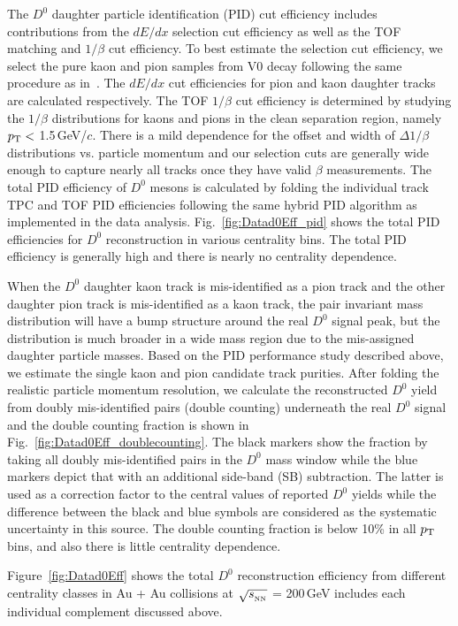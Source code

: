 \documentclass[%
 reprint,	
 amsmath,amssymb,
 aps,
 prc,
]{revtex4-1}
\begin{document}
The $D^0$ daughter particle identification (PID) cut efficiency includes contributions from the $dE/dx$ selection cut efficiency as well as the TOF matching and $1/\beta$ cut efficiency. To best estimate the selection cut efficiency, we select the pure kaon and pion samples from V0 decay following the same procedure as in~\cite{Shao:2005iu,Xu:2008th}. The $dE/dx$ cut efficiencies for pion and kaon daughter tracks are calculated respectively. The TOF $1/\beta$ cut efficiency is determined by studying the $1/\beta$ distributions for kaons and pions in the clean separation region, namely $p_{\rm T}<$ 1.5\,GeV/$c$. There is a mild dependence for the offset and width of $\Delta 1/\beta$ distributions vs. particle momentum and our selection cuts are generally wide enough to capture nearly all tracks once they have valid $\beta$ measurements. The total PID efficiency of $D^0$ mesons is calculated by folding the individual track TPC and TOF PID efficiencies following the same hybrid PID algorithm as implemented in the data analysis. Fig.~\ref{fig:Datad0Eff_pid} shows the total PID efficiencies for $D^0$ reconstruction in various centrality bins. The total PID efficiency is generally high and there is nearly no centrality dependence.

When the $D^0$ daughter kaon track is mis-identified as a pion track and the other daughter pion track is mis-identified as a kaon track, the pair invariant mass distribution will have a bump structure around the real $D^0$ signal peak, but the distribution is much broader in a wide mass region due to the mis-assigned daughter particle masses. Based on the PID  performance study described above, we estimate the single kaon and pion candidate track purities. After folding the realistic particle momentum resolution, we calculate the reconstructed $D^0$ yield from doubly mis-identified pairs (double counting) underneath the real $D^0$ signal and the double counting fraction is shown in Fig.~\ref{fig:Datad0Eff_doublecounting}. The black markers show the fraction by taking all doubly mis-identified pairs in the $D^0$ mass window while the blue markers depict that with an additional side-band (SB) subtraction. The latter is used as a correction factor to the central values of reported $D^0$ yields while the difference between the black and blue symbols are considered as the systematic uncertainty in this source. The double counting fraction is below 10\% in all $p_{\rm T}$ bins, and also there is little centrality dependence.

Figure~\ref{fig:Datad0Eff} shows the total $D^{0}$ reconstruction efficiency from different centrality classes in Au + Au collisions at $\sqrt{s_{_{\rm NN}}}$ = 200\,GeV includes each individual complement discussed above.
\end{document}
